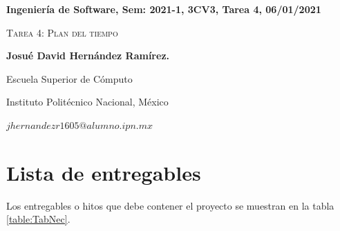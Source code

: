 \documentclass[12pt,twoside]{article}
\date{}
\begin{document}
\centerline{\bf Ingeniería de Software, Sem: 2021-1, 3CV3, Tarea 4, 06/01/2021}
\centerline{}
\centerline{}
\begin{center}
\Large{\textsc{Tarea 4: Plan del tiempo}}
\end{center}
\centerline{}
\centerline{\bf {Josu\'e David Hern\'andez Ram\'irez.}}
\centerline{}
\centerline{Escuela Superior de C\'omputo}
\centerline{Instituto Polit\'ecnico Nacional, M\'exico}
\centerline{$jhernandezr1605@alumno.ipn.mx$}
\newtheorem{Theorem}{\quad Theorem}[section]
\newtheorem{Definition}[Theorem]{\quad Definition}
\newtheorem{Corollary}[Theorem]{\quad Corollary}
\newtheorem{Lemma}[Theorem]{\quad Lemma}
\newtheorem{Example}[Theorem]{\quad Example}
\bigskip
\section{Lista de entregables}
Los entregables o hitos que debe contener el proyecto se muestran en la tabla \ref{table:TabNec}.
\end{document}
